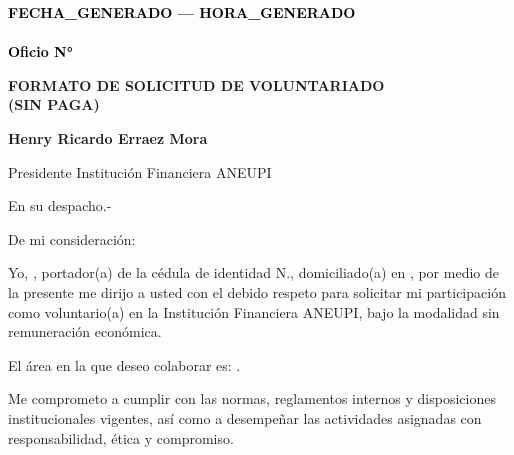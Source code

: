 \documentclass[a4paper,12pt]{article}
\begin{document}
\pagestyle{empty}

\vspace*{-5.5cm}
\begin{flushright}
{\footnotesize \textcolor{black}{\textbf{{{FECHA_GENERADO}} --- {{{HORA_GENERADO}}}}}} \\[-10pt] %
{\footnotesize \textcolor{black}{\underline{\hspace{7.5cm}}}} \\[-2pt] %
{\footnotesize \textcolor{black}{\textbf{Oficio N° }}} 
\end{flushright}


\vspace{2.5cm}
\noindent
\hspace*{\dimexpr\textwidth+1cm\relax}


\begin{center}
\textbf{\large FORMATO DE SOLICITUD DE VOLUNTARIADO \\ (SIN PAGA)}
\end{center}


\vspace{0.8cm}

\noindent \textbf{Henry Ricardo Erraez Mora} 

\noindent Presidente Institución Financiera ANEUPI 

\noindent En su despacho.-

\vspace{1cm}

\noindent De mi consideración:

Yo, \textbf{\underline{\hspace{6cm}}}, portador(a) de la cédula de identidad N.\textbf{\underline{\hspace{4cm}}}, domiciliado(a) en \textbf{\underline{\hspace{8cm}}}, por medio de la presente me dirijo a usted con el debido respeto para solicitar mi participación como voluntario(a) en la Institución Financiera ANEUPI, bajo la modalidad sin remuneración económica.

\vspace{0.5cm}

El área en la que deseo colaborar es: \textbf{\underline{\hspace{6cm}}}.

\vspace{0.5cm}

Me comprometo a cumplir con las normas, reglamentos internos y disposiciones institucionales vigentes, así como a desempeñar las actividades asignadas con responsabilidad, ética y compromiso.
\end{document}
